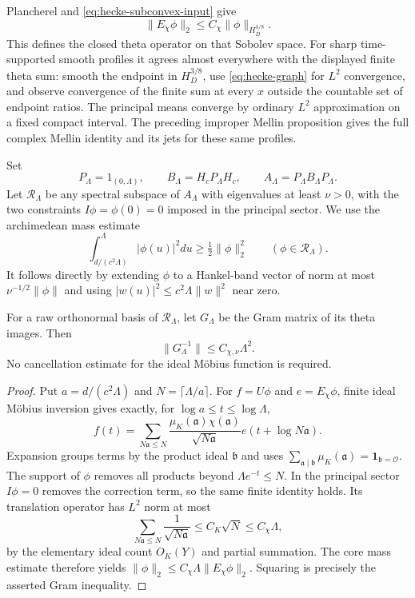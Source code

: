 Plancherel and \eqref{eq:hecke-subconvex-input} give
\begin{equation}\label{eq:hecke-graph}
 \|E_\chi\phi\|_2\leq C_\chi\|\phi\|_{H_D^{3/8}}.
\end{equation}
This defines the closed theta operator on that Sobolev space.
For sharp time-supported smooth profiles it agrees almost
everywhere with the displayed finite theta sum: smooth the endpoint
in $H_D^{3/8}$, use \eqref{eq:hecke-graph} for $L^2$ convergence,
and observe convergence of the finite sum at every $x$ outside the
countable set of endpoint ratios.  The principal means converge by
ordinary $L^2$ approximation on a fixed compact interval.
The preceding improper Mellin proposition gives the full complex
Mellin identity and its jets for these same profiles.

Set
\[
 P_\Lambda=1_{(0,\Lambda)},\qquad
 B_\Lambda=H_cP_\Lambda H_c,\qquad
 A_\Lambda=P_\Lambda B_\Lambda P_\Lambda.
\]
Let $\mathcal R_\Lambda$ be any spectral subspace of $A_\Lambda$
with eigenvalues at least $\nu>0$, with the two constraints
$I\phi=\phi(0)=0$ imposed in the principal sector.  We use the
archimedean mass estimate
\begin{equation}\label{eq:hecke-core-mass}
 \int_{d/(c^2\Lambda)}^\Lambda|\phi(u)|^2du
                         \geq\tfrac12\|\phi\|_2^2
 \qquad(\phi\in\mathcal R_\Lambda).
\end{equation}
It follows directly by extending $\phi$ to a Hankel-band vector
of norm at most $\nu^{-1/2}\|\phi\|$ and using
$|w(u)|^2\leq c^2\Lambda\|w\|^2$ near zero.

\begin{proposition}
\label{prop:hecke-crude-gram}
For a raw orthonormal basis of $\mathcal R_\Lambda$, let $G_\Lambda$
be the Gram matrix of its theta images.  Then
\[
 \|G_\Lambda^{-1}\|\leq C_{\chi,\nu}\Lambda^2.
\]
No cancellation estimate for the ideal M\"obius function is required.
\end{proposition}

\begin{proof}
Put $a=d/(c^2\Lambda)$ and $N=\lceil\Lambda/a\rceil$.
For $f=U\phi$ and $e=E_\chi\phi$, finite ideal M\"obius inversion
gives exactly, for $\log a\leq t\leq\log\Lambda$,
\[
 f(t)=\sum_{N\mathfrak a\leq N}
  \frac{\mu_K(\mathfrak a)\chi(\mathfrak a)}{\sqrt{N\mathfrak a}}
                         e(t+\log N\mathfrak a).
\]
Expansion groups terms by the product ideal $\mathfrak b$ and uses
$\sum_{\mathfrak a\mid\mathfrak b}\mu_K(\mathfrak a)
=\mathbf1_{\mathfrak b=\mathcal O}$.  The support of $\phi$ removes
all products beyond $\Lambda e^{-t}\leq N$.  In the principal sector
$I\phi=0$ removes the correction term, so the same finite identity
holds.  Its translation operator has $L^2$ norm at most
\[
 \sum_{N\mathfrak a\leq N}\frac1{\sqrt{N\mathfrak a}}
                         \leq C_K\sqrt N\leq C_\chi\Lambda,
\]
by the elementary ideal count $O_K(Y)$ and partial summation.
The core mass estimate therefore yields
$\|\phi\|_2\leq C_\chi\Lambda\|E_\chi\phi\|_2$.
Squaring is precisely the asserted Gram inequality.
\end{proof}

